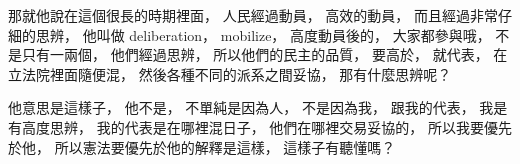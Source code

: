 \hypertarget{w02:cue:2084}{}那就他說在這個很長的時期裡面，
\hypertarget{w02:cue:2085}{}人民經過動員，
\hypertarget{w02:cue:2086}{}高效的動員，
\hypertarget{w02:cue:2087}{}而且經過非常仔細的思辨，
\hypertarget{w02:cue:2088}{}他叫做 deliberation，
\hypertarget{w02:cue:2089}{}mobilize，
\hypertarget{w02:cue:2090}{}高度動員後的，
\hypertarget{w02:cue:2091}{}大家都參與哦，
\hypertarget{w02:cue:2092}{}不是只有一兩個，
\hypertarget{w02:cue:2093}{}他們經過思辨，
\hypertarget{w02:cue:2094}{}所以他們的民主的品質，
\hypertarget{w02:cue:2095}{}要高於，
\hypertarget{w02:cue:2096}{}就代表，
\hypertarget{w02:cue:2097}{}在立法院裡面隨便混，
\hypertarget{w02:cue:2098}{}然後各種不同的派系之間妥協，
\hypertarget{w02:cue:2099}{}那有什麼思辨呢？

\hypertarget{w02:cue:2100}{}他意思是這樣子，
\hypertarget{w02:cue:2101}{}他不是，
\hypertarget{w02:cue:2102}{}不單純是因為人，
\hypertarget{w02:cue:2103}{}不是因為我，
\hypertarget{w02:cue:2104}{}跟我的代表，
\hypertarget{w02:cue:2105}{}
\hypertarget{w02:cue:2106}{}我是有高度思辨，
\hypertarget{w02:cue:2107}{}我的代表是在哪裡混日子，
\hypertarget{w02:cue:2108}{}他們在哪裡交易妥協的，
\hypertarget{w02:cue:2109}{}所以我要優先於他，
\hypertarget{w02:cue:2110}{}所以憲法要優先於他的解釋是這樣，
\hypertarget{w02:cue:2111}{}這樣子有聽懂嗎？

